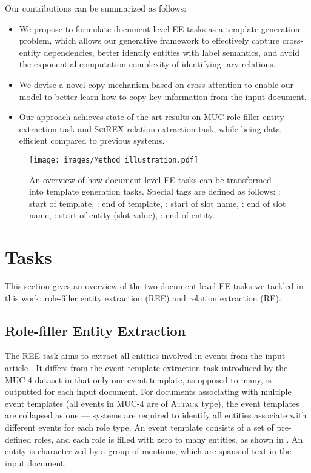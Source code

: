 \documentclass[11pt]{article}
\begin{document}
Our contributions can be summarized as follows:
\begin{itemize}
  \item We propose to formulate document-level EE tasks as a template generation problem, which allows our generative framework to effectively capture cross-entity dependencies, better identify entities with label semantics, and avoid the exponential computation complexity of identifying -ary relations.
  \item We devise a novel copy mechanism based on cross-attention to enable our model to better learn how to copy key information from the input document.
  \item Our approach achieves state-of-the-art results on MUC role-filler entity extraction task and \textsc{SciREX} relation extraction task, while being data efficient compared to previous systems.
\end{itemize}

 \begin{figure*}[t]
    \centering
    \texttt{[image: images/Method\_illustration.pdf]}
    \caption{An overview of how document-level EE tasks can be transformed into template generation tasks. Special tags are defined as follows: : start of template, : end of template, : start of slot name, : end of slot name, : start of entity (slot value), : end of entity.}
    \label{fig:method}
    \vspace{-5mm}
\end{figure*}
\section{Tasks}
This section gives an overview of the two document-level EE tasks we tackled in this work: role-filler entity extraction (REE) and relation extraction (RE). \subsection{Role-filler Entity Extraction}
The REE task aims to extract all entities involved in events from the input article \cite{du-2020-grit}. 
It differs from the event template extraction task introduced by the MUC-4 dataset \cite{muc-1992-message} in that only one event template, as opposed to many, is outputted for each input document. For documents associating with multiple event templates (all events in MUC-4 are of \textsc{Attack} type), the event templates are collapsed as one --- systems are required to identify all entities associate with different events for each role type. An event template consists of a set of pre-defined roles, and each role is filled with zero to many entities, as shown in . An entity is characterized by a group of mentions, which are spans of text in the input document. 
\end{document}
